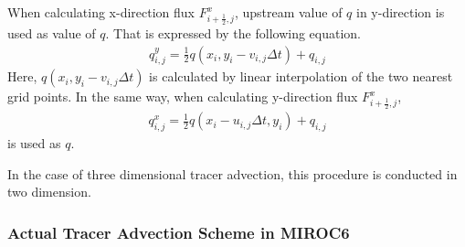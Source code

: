 When calculating x-direction flux \(F^{x}_{i+\frac{1}{2},j}\), upstream value of \(q\) in y-direction is used as value of \(q\). That is expressed by the following equation.
\begin{eqnarray}q^{y}_{i,j}=\frac{1}{2} {q(x_{i},y_{i}-v_{i,j}\Delta t)+q_{i,j}}\end{eqnarray} Here, \(q(x_{i},y_{i}-v_{i,j}\Delta t)\) is calculated by linear interpolation of the two nearest grid points. In the same way,
when calculating y-direction flux \(F^{x}_{i+\frac{1}{2},j}\), \begin{eqnarray}q^{x}_{i,j}=\frac{1}{2} {q(x_{i}-u_{i,j}\Delta t,y_{i})+q_{i,j}}\end{eqnarray} is used as \(q\).

In the case of three dimensional tracer advection, this procedure is conducted in two dimension.

\hypertarget{actual-tracer-advection-scheme-in-miroc6}{%
\subsubsection{Actual Tracer Advection Scheme in MIROC6}\label{actual-tracer-advection-scheme-in-miroc6}}

